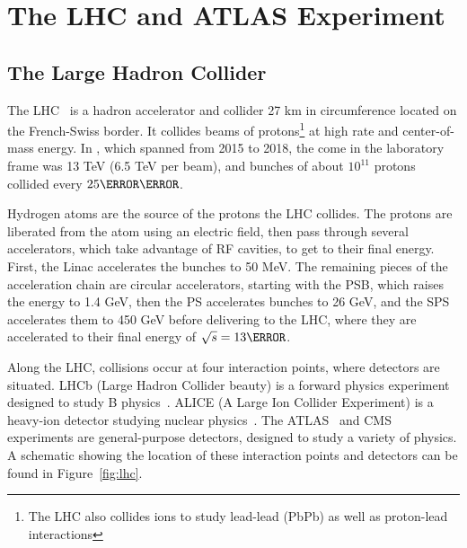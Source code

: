 \chapter{The LHC and ATLAS Experiment}

\section{The Large Hadron Collider}
The \gls{LHC}~\cite{lhc} is a hadron accelerator and collider 27 km in circumference located on the French-Swiss border. It collides beams of protons\footnote{The LHC also collides ions to study lead-lead (PbPb) as well as proton-lead interactions} at high rate and center-of-mass energy. In \RunTwo, which spanned from 2015 to 2018, the \gls{come} in the laboratory frame was 13 TeV (6.5 TeV per beam), and bunches of about $10^{11}$ protons collided every $\unit{25}{\nano\second}$.

Hydrogen atoms are the source of the protons the \gls{LHC} collides. The protons are liberated from the atom using an electric field, then pass through several accelerators, which take advantage of \gls{RF} cavities, to get to their final energy. First, the \gls{Linac} accelerates the bunches to 50 MeV. The remaining pieces of the acceleration chain are circular accelerators, starting with the \gls{PSB}, which raises the energy to 1.4 GeV, then the \gls{PS} accelerates bunches to 26 GeV, and the \gls{SPS} accelerates them to 450 GeV before delivering to the \gls{LHC}, where they are accelerated to their final energy of $\sqrt{s} = \unit{13}{\TeV}$.

Along the \gls{LHC}, collisions occur at four interaction points, where detectors are situated. LHCb (Large Hadron Collider beauty) is a forward physics experiment designed to study B physics~\cite{lhcb}. ALICE (A Large Ion Collider Experiment) is a heavy-ion detector studying nuclear physics~\cite{alice}. The ATLAS~\cite{atlas-experiment} and \gls{CMS}~\cite{cms} experiments are general-purpose detectors, designed to study a variety of physics. A schematic showing the location of these interaction points and detectors can be found in Figure~\ref{fig:lhc}.

